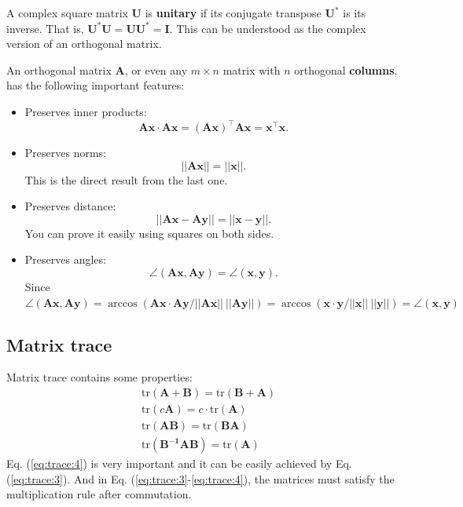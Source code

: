 \documentclass[12pt]{article}
\numberwithin{equation}{section}
\begin{document}
A complex square matrix $\mathbf{U}$ is \textbf{unitary} if its conjugate transpose $\mathbf{U}^*$ is its inverse. That is, $\mathbf{U}^* \mathbf{U} = \mathbf{U} \mathbf{U}^* = \mathbf{I}$. This can be understood as the complex version of an orthogonal matrix.

An orthogonal matrix $\mathbf{A}$, or even any $m \times n$ matrix with $n$ orthogonal \textbf{columns}, has the following important features:
\begin{itemize}
\item Preserves inner products:
\begin{equation}
\mathbf{Ax \cdot Ax} = \mathbf{(Ax)^\top Ax} = \mathbf{x^\top x}.
\label{eq:orthogonal:1}
\end{equation}
\item Preserves norms:
\begin{equation}
||\mathbf{Ax}|| = ||\mathbf{x}||.
\label{eq:orthogonal:2}
\end{equation}
This is the direct result from the last one.
\item Preserves distance:
\begin{equation}
||\mathbf{Ax - Ay}|| = ||\mathbf{x - y}||.
\label{eq:orthogonal:3}
\end{equation}
You can prove it easily using squares on both sides.
\item Preserves angles:
\begin{equation}
\angle(\mathbf{Ax,Ay}) = \angle(\mathbf{x,y}).
\label{eq:orthogonal:4}
\end{equation}
Since $\angle(\mathbf{Ax,Ay}) = \arccos(\mathbf{Ax \cdot Ay} /||\mathbf{Ax}|| \ ||\mathbf{Ay}||) = \arccos(\mathbf{x \cdot y} /||\mathbf{x}|| \ ||\mathbf{y}||) = \angle(\mathbf{x,y})$
\end{itemize}

\subsection{Matrix trace}
\label{sec:trace}

Matrix trace contains some properties:
\begin{align}
& \text{tr}(\mathbf{A + B}) = \text{tr}(\mathbf{B + A}) \label{eq:trace:1} \\
& \text{tr}(c\mathbf{A}) = c\cdot \text{tr}(\mathbf{A}) \label{eq:trace:2} \\
& \text{tr}(\mathbf{AB}) = \text{tr}(\mathbf{BA}) \label{eq:trace:3} \\
& \text{tr}(\mathbf{B^{-1}AB}) = \text{tr}(\mathbf{A}) \label{eq:trace:4}
\end{align}
Eq. (\ref{eq:trace:4}) is very important and it can be easily achieved by Eq. (\ref{eq:trace:3}). And in Eq. (\ref{eq:trace:3}-\ref{eq:trace:4}), the matrices must satisfy the multiplication rule after commutation.
\end{document}
